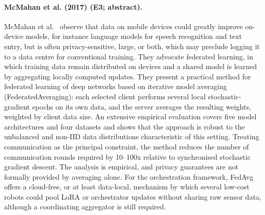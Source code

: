 \documentclass[10pt,a4paper]{article}
\begin{document}
\paragraph{McMahan et al. (2017) (E3; abstract).} McMahan et al.~\cite{McMahan2017} observe that data on mobile devices could greatly improve on-device models, for instance language models for speech recognition and text entry, but is often privacy-sensitive, large, or both, which may preclude logging it to a data centre for conventional training. They advocate federated learning, in which training data remain distributed on devices and a shared model is learned by aggregating locally computed updates. They present a practical method for federated learning of deep networks based on iterative model averaging (FederatedAveraging): each selected client performs several local stochastic-gradient epochs on its own data, and the server averages the resulting weights, weighted by client data size. An extensive empirical evaluation covers five model architectures and four datasets and shows that the approach is robust to the unbalanced and non-IID data distributions characteristic of this setting. Treating communication as the principal constraint, the method reduces the number of communication rounds required by 10--100x relative to synchronised stochastic gradient descent. The analysis is empirical, and privacy guarantees are not formally provided by averaging alone. For the orchestration framework, FedAvg offers a cloud-free, or at least data-local, mechanism by which several low-cost robots could pool LoRA or orchestrator updates without sharing raw sensor data, although a coordinating aggregator is still required.
\end{document}
